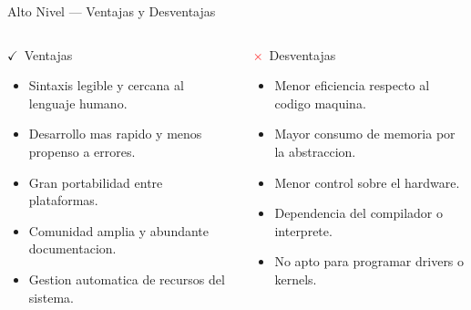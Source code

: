 \documentclass[10pt, aspectratio=169]{beamer}
\begin{document}
	\begin{frame}{Alto Nivel --- Ventajas y Desventajas}
		\begin{columns}
			\begin{block}{\textcolor{unemiNaranja}{$\checkmark$}\ Ventajas}
				\begin{itemize}
					\item Sintaxis legible y cercana al lenguaje humano.
					\item Desarrollo mas rapido y menos propenso a errores.
					\item Gran portabilidad entre plataformas.
					\item Comunidad amplia y abundante documentacion.
					\item Gestion automatica de recursos del sistema.
				\end{itemize}
			\end{block}
			\begin{block}{\textcolor{red}{$\times$}\ Desventajas}
				\begin{itemize}
					\item Menor eficiencia respecto al codigo maquina.
					\item Mayor consumo de memoria por la abstraccion.
					\item Menor control sobre el hardware.
					\item Dependencia del compilador o interprete.
					\item No apto para programar drivers o kernels.
				\end{itemize}
			\end{block}
		\end{columns}
	\end{frame}
	
\end{document}
